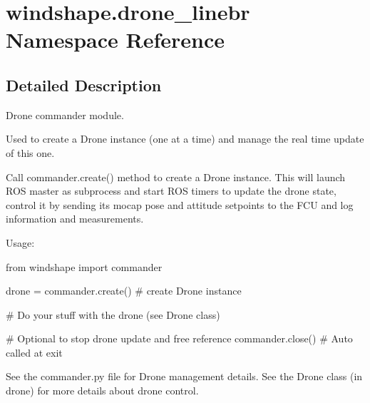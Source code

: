 \hypertarget{namespacewindshape_1_1drone__linebr}{}\section{windshape.\+drone\+\_\+linebr Namespace Reference}
\label{namespacewindshape_1_1drone__linebr}


\subsection{Detailed Description}
\begin{DoxyVerb}Drone commander module.

Used to create a Drone instance (one at a time) and manage the real time
update of this one.

Call commander.create() method to create a Drone instance. This will
launch ROS master as subprocess and start ROS timers to update the
drone state, control it by sending its mocap pose and attitude setpoints
to the FCU and log information and measurements.

Usage:

    from windshape import commander
    
    drone = commander.create() # create Drone instance
    
    # Do your stuff with the drone (see Drone class)
    
    # Optional to stop drone update and free reference
    commander.close() # Auto called at exit
    
See the commander.py file for Drone management details.
See the Drone class (in drone) for more details about drone control.
\end{DoxyVerb}
 